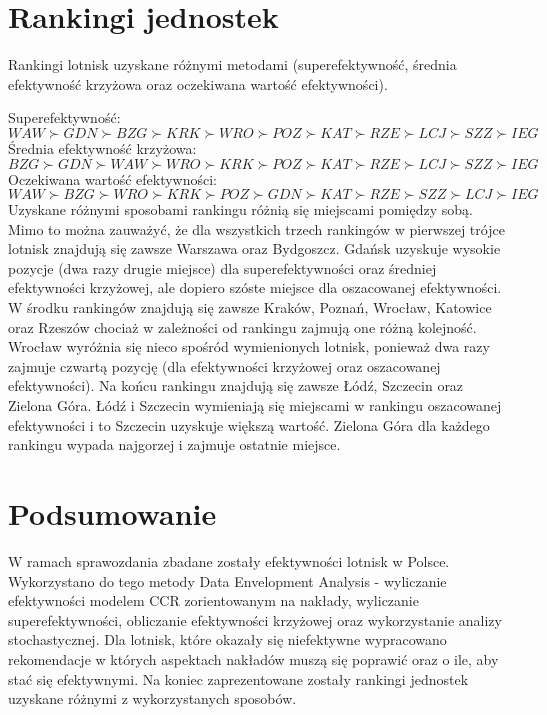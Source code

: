 \documentclass[a4paper,12pt]{article}
\begin{document}
\section{Rankingi jednostek}
Rankingi lotnisk uzyskane różnymi metodami (superefektywność, średnia efektywność krzyżowa oraz oczekiwana wartość efektywności).

\noindent Superefektywność: $ WAW \succ GDN \succ BZG \succ KRK \succ WRO \succ POZ \succ KAT \succ RZE \succ LCJ \succ SZZ \succ IEG$ \\
Średnia efektywność krzyżowa: $ BZG \succ GDN \succ WAW \succ WRO \succ KRK \succ POZ \succ KAT \succ RZE \succ LCJ \succ SZZ \succ IEG $ \\
Oczekiwana wartość efektywności: $ WAW \succ BZG \succ WRO \succ KRK \succ POZ \succ GDN \succ KAT \succ RZE \succ SZZ \succ LCJ \succ IEG $ \\

\noindent Uzyskane różnymi sposobami rankingu różnią się miejscami pomiędzy sobą.
Mimo to można zauważyć, że dla wszystkich trzech rankingów w pierwszej trójce lotnisk znajdują się zawsze Warszawa oraz Bydgoszcz.
Gdańsk uzyskuje wysokie pozycje (dwa razy drugie miejsce) dla superefektywności oraz średniej efektywności krzyżowej, ale dopiero szóste miejsce dla oszacowanej efektywności.
W środku rankingów znajdują się zawsze Kraków, Poznań, Wrocław, Katowice oraz Rzeszów chociaż w zależności od rankingu zajmują one różną kolejność.
Wrocław wyróżnia się nieco spośród wymienionych lotnisk, ponieważ dwa razy zajmuje czwartą pozycję (dla efektywności krzyżowej oraz oszacowanej efektywności).
Na końcu rankingu znajdują się zawsze Łódź, Szczecin oraz Zielona Góra. Łódź i Szczecin wymieniają się miejscami w rankingu oszacowanej efektywności i to Szczecin uzyskuje większą wartość.
Zielona Góra dla każdego rankingu wypada najgorzej i zajmuje ostatnie miejsce.

\section{Podsumowanie}

W ramach sprawozdania zbadane zostały efektywności lotnisk w Polsce. Wykorzystano do tego metody Data Envelopment Analysis - wyliczanie efektywności modelem CCR zorientowanym na nakłady, wyliczanie superefektywności, obliczanie efektywności krzyżowej oraz wykorzystanie analizy stochastycznej.
Dla lotnisk, które okazały się niefektywne wypracowano rekomendacje w których aspektach nakładów muszą się poprawić oraz o ile, aby stać się efektywnymi. Na koniec zaprezentowane zostały rankingi jednostek uzyskane różnymi z wykorzystanych sposobów.
\end{document}
